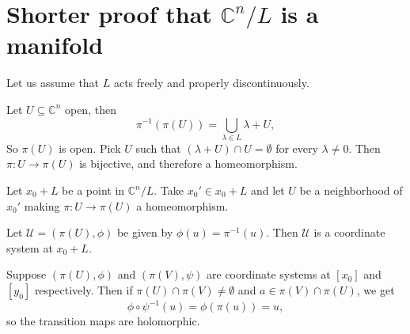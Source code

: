 \documentclass{article}
\theoremstyle{definition}
\begin{document}
\section{Shorter proof that $\mathbb{C}^n/L$ is a manifold}
Let us assume that $L$ acts freely and properly discontinuously.

Let $U\subseteq\mathbb{C}^n$ open, then
\[\pi^{-1}(\pi(U))=\bigcup_{\lambda\in L}\lambda+U,\]
So $\pi(U)$ is open. Pick $U$ such that $(\lambda+U)\cap U=\emptyset$ for every $\lambda\neq 0$. Then $\pi:U\to\pi(U)$ is bijective, and therefore a homeomorphism.

Let $x_0+L$ be a point in $\mathbb{C}^n/L$. Take $x_0'\in x_0+L$ and let $U$ be a neighborhood of $x_0'$ making $\pi:U\to\pi(U)$ a homeomorphism.

Let $\mathcal{U}=(\pi(U),\phi)$ be given by $\phi(u)=\pi^{-1}(u)$. Then $\mathcal{U}$ is a coordinate system at $x_0+L$.

Suppose $(\pi(U),\phi)$ and $(\pi(V),\psi)$ are coordinate systems at $[x_0]$ and $[y_0]$ respectively. Then if $\pi(U)\cap\pi(V)\neq\emptyset$ and $a\in\pi(V)\cap\pi(U)$, we get
\[\phi\circ\psi^{-1}(u)=\phi(\pi(u))=u,\]
so the transition maps are holomorphic.

%
\end{document}
